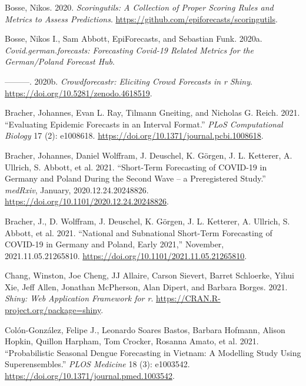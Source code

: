 \documentclass[
]{article}
\newlength{\cslhangindent}
\newlength{\cslentryspacingunit} %
\newenvironment{CSLReferences}[2] %
 {%
  \setlength{\parindent}{0pt}
  \ifodd #1
  \let\oldpar\par
  \def\par{\hangindent=\cslhangindent\oldpar}
  \fi
  \setlength{\parskip}{#2\cslentryspacingunit}
 }%
 {}
\begin{document}
\begin{CSLReferences}{1}{0}
\leavevmode{}%
Bosse, Nikos. 2020. \emph{Scoringutils: A Collection of Proper Scoring Rules and Metrics to Assess Predictions}. \url{https://github.com/epiforecasts/scoringutils}.

\leavevmode{}%
Bosse, Nikos I., Sam Abbott, EpiForecasts, and Sebastian Funk. 2020a. \emph{Covid.german.forecasts: Forecasting Covid-19 Related Metrics for the German/Poland Forecast Hub}.

\leavevmode{}%
---------. 2020b. \emph{Crowdforecastr: Eliciting Crowd Forecasts in r Shiny}. \url{https://doi.org/10.5281/zenodo.4618519}.

\leavevmode{}%
Bracher, Johannes, Evan L. Ray, Tilmann Gneiting, and Nicholas G. Reich. 2021. {``Evaluating Epidemic Forecasts in an Interval Format.''} \emph{PLoS Computational Biology} 17 (2): e1008618. \url{https://doi.org/10.1371/journal.pcbi.1008618}.

\leavevmode{}%
Bracher, Johannes, Daniel Wolffram, J. Deuschel, K. Görgen, J. L. Ketterer, A. Ullrich, S. Abbott, et al. 2021. {``Short-Term Forecasting of {COVID}-19 in {Germany} and {Poland} During the Second Wave -- a Preregistered Study.''} \emph{medRxiv}, January, 2020.12.24.20248826. \url{https://doi.org/10.1101/2020.12.24.20248826}.

\leavevmode{}%
Bracher, J., D. Wolffram, J. Deuschel, K. Görgen, J. L. Ketterer, A. Ullrich, S. Abbott, et al. 2021. {``National and Subnational Short-Term Forecasting of {COVID}-19 in {Germany} and {Poland}, Early 2021,''} November, 2021.11.05.21265810. \url{https://doi.org/10.1101/2021.11.05.21265810}.

\leavevmode{}%
Chang, Winston, Joe Cheng, JJ Allaire, Carson Sievert, Barret Schloerke, Yihui Xie, Jeff Allen, Jonathan McPherson, Alan Dipert, and Barbara Borges. 2021. \emph{Shiny: Web Application Framework for r}. \url{https://CRAN.R-project.org/package=shiny}.

\leavevmode{}%
Colón-González, Felipe J., Leonardo Soares Bastos, Barbara Hofmann, Alison Hopkin, Quillon Harpham, Tom Crocker, Rosanna Amato, et al. 2021. {``Probabilistic Seasonal Dengue Forecasting in {Vietnam}: A Modelling Study Using Superensembles.''} \emph{PLOS Medicine} 18 (3): e1003542. \url{https://doi.org/10.1371/journal.pmed.1003542}.


\end{CSLReferences}
\end{document}
